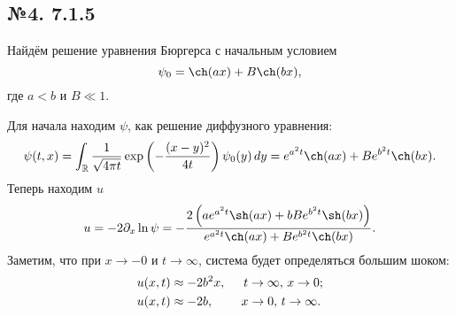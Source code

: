 \subsection*{№4. 7.1.5}

Найдём решение уравнения Бюргерса с начальным условием
\begin{equation*}
    \psi_0 = \ch(a x) + B \ch(bx),
\end{equation*}
где $a < b$ и $B \ll 1$.

Для начала находим $\psi$, как решение диффузного уравнения:
\begin{equation*}
    \psi(t, x) = \int_{\mathbb{R}} \frac{1}{\sqrt{4 \pi t}} \exp\left(
        - \frac{(x-y)^2}{4t}
    \right) \psi_0(y) \d  y = e^{a^2 t} \ch(a x) + B e^{b^2 t} \ch(bx).
\end{equation*}
Теперь находим $u$
\begin{equation*}
    u = -2 \partial_x \ln \psi = -\frac{2 \left(a e^{a^2 t} \sh (a x)+b B e^{b^2 t} \sh (b x)\right)}{e^{a^2 t} \ch (a x)+B e^{b^2 t} \ch (b x)}.
\end{equation*}
Заметим, что при $x \to -0$ и $t \to \infty$, система будет определяться большим шоком:
\begin{align*}
    u(x, t)  &\approx - 2 b^2 x, \hspace{5 mm} t \to \infty,\,  x \to 0; \\
    u(x, t)  &\approx - 2 b, \ \ \, \hspace{5 mm} x \to 0,\,  t \to \infty.\\
\end{align*}

